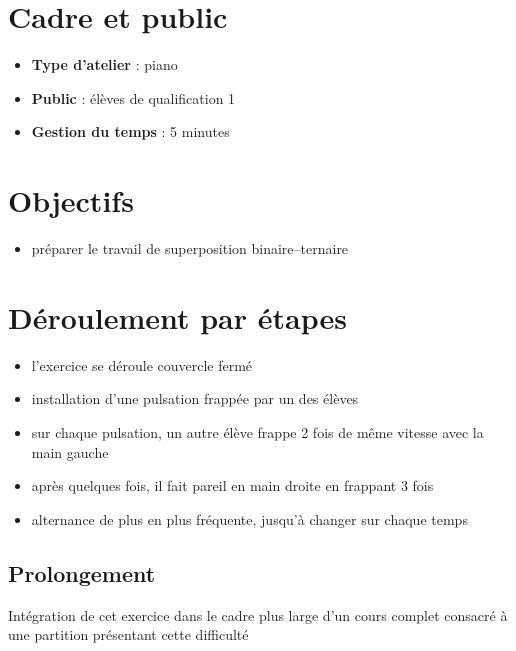 \documentclass[a4paper,11pt,bibliography=totoc,numbers=noenddot,listof=flat,DIV=11,BCOR=0mm]{scrreprt}%
\begin{document}
\section*{Cadre et public}
\begin{itemize}
\item [\textbullet]\textbf{Type d'atelier} : piano

\item [\textbullet]\textbf{Public} : élèves de qualification 1

\item [\textbullet]\textbf{Gestion du temps} : 5 minutes

\end{itemize}

\section*{Objectifs}
\begin{itemize}
\item préparer le travail de superposition binaire--ternaire
\end{itemize}


\section*{Déroulement par étapes}
\begin{itemize}
\item l'exercice se déroule couvercle fermé
\item installation d'une pulsation frappée par un des élèves
\item sur chaque pulsation, un autre élève frappe 2 fois de même vitesse avec la main gauche
\item après quelques fois, il fait pareil en main droite en frappant 3 fois
\item alternance de plus en plus fréquente, jusqu'à changer sur chaque temps
\end{itemize}

\subsection*{Prolongement}
Intégration de cet exercice dans le cadre plus large d'un cours complet consacré à une partition présentant cette difficulté
\end{document}
